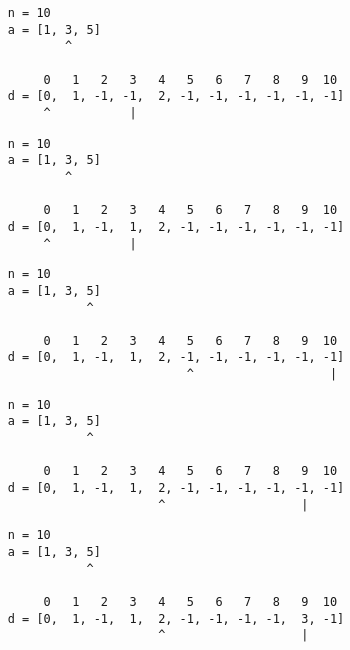 \begin{frame}[fragile]
\begin{verbatim}
     n = 10
     a = [1, 3, 5]
             ^

          0   1   2   3   4   5   6   7   8   9  10
     d = [0,  1, -1, -1,  2, -1, -1, -1, -1, -1, -1]
          ^           |
\end{verbatim}
\end{frame}
\addtocounter{framenumber}{-1}

\begin{frame}[fragile]
\begin{verbatim}
     n = 10
     a = [1, 3, 5]
             ^

          0   1   2   3   4   5   6   7   8   9  10
     d = [0,  1, -1,  1,  2, -1, -1, -1, -1, -1, -1]
          ^           |
\end{verbatim}
\end{frame}
\addtocounter{framenumber}{-1}

\begin{frame}[fragile]
\begin{verbatim}
     n = 10
     a = [1, 3, 5]
                ^

          0   1   2   3   4   5   6   7   8   9  10
     d = [0,  1, -1,  1,  2, -1, -1, -1, -1, -1, -1]
                              ^                   |
\end{verbatim}
\end{frame}
\addtocounter{framenumber}{-1}

\begin{frame}[fragile]
\begin{verbatim}
     n = 10
     a = [1, 3, 5]
                ^

          0   1   2   3   4   5   6   7   8   9  10
     d = [0,  1, -1,  1,  2, -1, -1, -1, -1, -1, -1]
                          ^                   |
\end{verbatim}
\end{frame}
\addtocounter{framenumber}{-1}

\begin{frame}[fragile]
\begin{verbatim}
     n = 10
     a = [1, 3, 5]
                ^

          0   1   2   3   4   5   6   7   8   9  10
     d = [0,  1, -1,  1,  2, -1, -1, -1, -1,  3, -1]
                          ^                   |
\end{verbatim}
\end{frame}
\addtocounter{framenumber}{-1}

